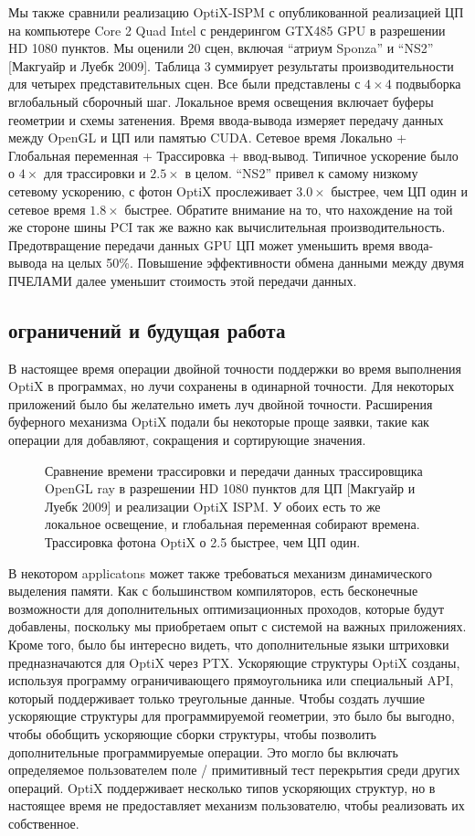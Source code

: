 Мы также сравнили реализацию OptiX-ISPM с опубликованной реализацией ЦП на компьютере Core 2 Quad Intel с рендерингом GTX485 GPU в разрешении HD 1080 пунктов. Мы оценили 20 сцен, включая “атриум Sponza” и “NS2” [Макгуайр и Луебк 2009]. Таблица 3 суммирует результаты производительности для четырех представительных сцен. Все были представлены с $4\times4$ подвыборка вглобальный сборочный шаг. Локальное время освещения включает буферы геометрии и схемы затенения. Время ввода-вывода измеряет передачу данных между OpenGL и ЦП или памятью CUDA. Сетевое время Локально + Глобальная переменная + Трассировка + ввод-вывод. Типичное ускорение было о $4\times$ для трассировки и $2.5\times$ в целом. “NS2” привел к самому низкому сетевому ускорению, с фотон OptiX прослеживает $3.0\times$ быстрее, чем ЦП один и сетевое время $1.8\times$ быстрее. Обратите внимание на то, что нахождение на той же стороне шины PCI так же важно как вычислительная производительность. Предотвращение передачи данных GPU ЦП может уменьшить время ввода-вывода на целых 50\%. Повышение эффективности обмена данными между двумя ПЧЕЛАМИ далее уменьшит стоимость этой передачи данных.
\subsection{ ограничений и будущая работа}
В настоящее время операции двойной точности поддержки во время выполнения OptiX в программах, но лучи сохранены в одинарной точности. Для некоторых приложений было бы желательно иметь луч двойной точности. Расширения буферного механизма OptiX подали бы некоторые проще заявки, такие как операции для добавляют, сокращения и сортирующие значения. 
\begin{figure}[h!]
\caption{Сравнение времени трассировки и передачи данных трассировщика OpenGL ray в разрешении HD 1080 пунктов для ЦП [Макгуайр и Луебк 2009] и реализации OptiX ISPM. У обоих есть то же локальное освещение, и глобальная переменная собирают времена. Трассировка фотона OptiX о 2.5 быстрее, чем ЦП один.}
\label{fig9}
\end{figure}
В некотором applicatons может также требоваться механизм динамического выделения памяти. Как с большинством компиляторов, есть бесконечные возможности для дополнительных оптимизационных проходов, которые будут добавлены, поскольку мы приобретаем опыт
с системой на важных приложениях. Кроме того, было бы интересно видеть, что дополнительные языки штриховки предназначаются для OptiX через PTX.
Ускоряющие структуры OptiX созданы, используя программу ограничивающего прямоугольника или специальный API, который поддерживает только треугольные данные. Чтобы создать лучшие ускоряющие структуры для программируемой геометрии, это было бы выгодно, чтобы обобщить ускоряющие сборки структуры, чтобы позволить
дополнительные программируемые операции. Это могло бы включать определяемое пользователем поле / примитивный тест перекрытия среди других операций. OptiX поддерживает несколько типов ускоряющих структур, но в настоящее время не предоставляет механизм пользователю, чтобы реализовать их собственное.

